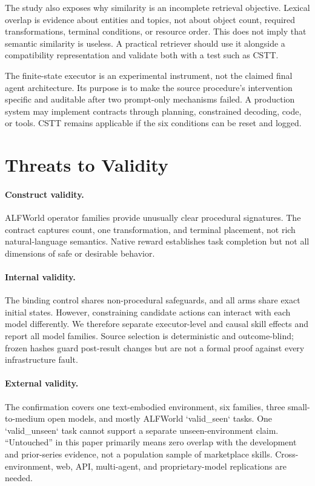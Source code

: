 \documentclass[10pt]{article}
\begin{document}
The study also exposes why similarity is an incomplete retrieval objective.
Lexical overlap is evidence about entities and topics, not about object count,
required transformations, terminal conditions, or resource order. This does
not imply that semantic similarity is useless. A practical retriever should use
it alongside a compatibility representation and validate both with a test such
as CSTT.

The finite-state executor is an experimental instrument, not the claimed final
agent architecture. Its purpose is to make the source procedure's intervention
specific and auditable after two prompt-only mechanisms failed. A production
system may implement contracts through planning, constrained decoding, code, or
tools. CSTT remains applicable if the six conditions can be reset and logged.

\section{Threats to Validity}
\paragraph{Construct validity.}
ALFWorld operator families provide unusually clear procedural signatures. The
contract captures count, one transformation, and terminal placement, not rich
natural-language semantics. Native reward establishes task completion but not
all dimensions of safe or desirable behavior.

\paragraph{Internal validity.}
The binding control shares non-procedural safeguards, and all arms share exact
initial states. However, constraining candidate actions can interact with each
model differently. We therefore separate executor-level and causal skill
effects and report all model families. Source selection is deterministic and
outcome-blind; frozen hashes guard post-result changes but are not a formal proof
against every infrastructure fault.

\paragraph{External validity.}
The confirmation covers one text-embodied environment, six families, three
small-to-medium open models, and mostly ALFWorld `valid\_seen` tasks. One
`valid\_unseen` task cannot support a separate unseen-environment claim.
``Untouched'' in this paper primarily means zero overlap with the development
and prior-series evidence, not a population sample of marketplace skills.
Cross-environment, web, API, multi-agent, and proprietary-model replications are
needed.
\end{document}
